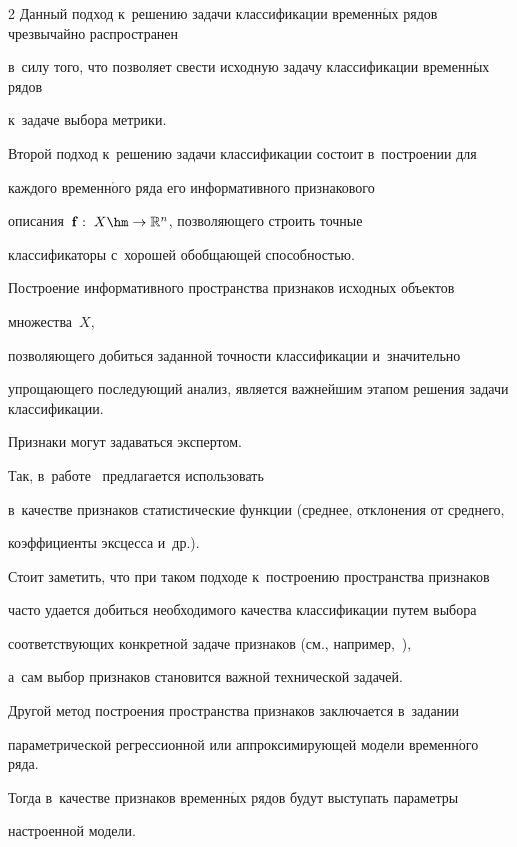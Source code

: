 \begin{multicols}{2}
Данный подход к~решению задачи классификации временн$\acute{\mbox{ы}}$х рядов чрезвычайно распространен 


в~силу того, что позволяет свести исходную задачу классификации временн$\acute{\mbox{ы}}$х рядов 


к~задаче выбора метрики.





Второй подход к~решению задачи классификации состоит в~построении для 


каждого временн$\acute{\mbox{о}}$го ряда его информативного признакового 


описания~$\mathbf{f}:\;X\hm\to\mathbb{R}^n$, позволяющего строить точные 


классификаторы с~хорошей обобщающей способностью.


Построение информативного пространства признаков исходных объектов


 множества~$X$,\linebreak


  позволяющего добиться заданной точности классификации и~значительно 


 упрощающего по\-сле\-ду\-ющий анализ, является важнейшим этапом решения задачи классификации.


Признаки могут задавать\-ся экспертом.


Так, в~работе~\cite{Nanopoulos01feature-basedclassification} предлагается использовать 


в~качестве признаков статистические функции (среднее, отклонения от среднего, 


коэффициенты эксцесса и~др.).


Стоит заметить, что при таком подходе к~построению пространства признаков 


час\-то удается добиться необходимого качества классификации путем выбора 


соответствующих конкретной задаче признаков (см., например,~\cite{wiens2012patient}), 


а~сам выбор признаков становится важной технической задачей.


Другой метод построения пространства признаков заключается в~задании 


параметрической регрессионной или аппроксимирующей модели временн$\acute{\mbox{о}}$го ряда.


Тогда в~качестве признаков временн$\acute{\mbox{ы}}$х рядов будут выступать параметры 


настроенной модели.



\end{multicols}
